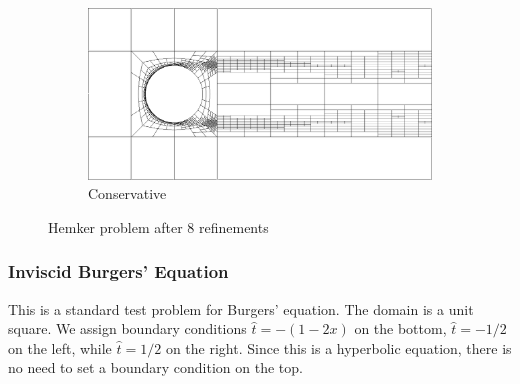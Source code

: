 \documentclass[letterpaper]{article}
\begin{document}
\begin{figure}[p]
\begin{subfigure}[t]{0.6\textwidth}
\end{subfigure}
\begin{subfigure}[t]{0.6\textwidth}
\centering
\includegraphics[width=\textwidth]{figs/Hemker/modified8c_mesh.png}
\caption{Conservative}
\label{fig:hemkerModified8c}
\end{subfigure}
\caption{Hemker problem after 8 refinements}
\label{fig:hemker8}
\end{figure}

\subsubsection{Inviscid Burgers' Equation}\label{sec:inviscidBurgers}
This is a standard test problem for Burgers' equation. The domain is a unit
square. We assign boundary conditions $\hat t=-(1-2x)$ on the bottom, $\hat
t=-1/2$ on the left, while $\hat t=1/2$ on the right. Since this is a
hyperbolic equation, there is no need to set a boundary condition on the top.
\end{document}
